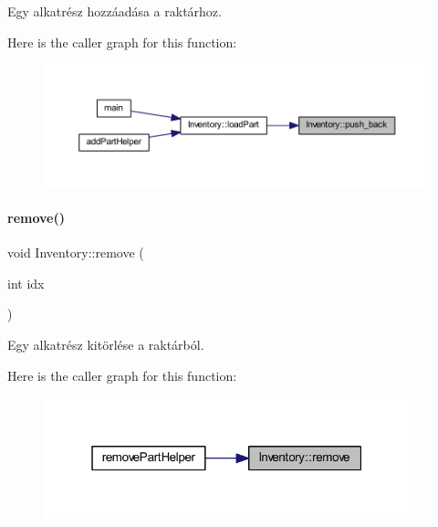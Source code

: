 Egy alkatrész hozzáadása a raktárhoz. 

Here is the caller graph for this function\+:
\nopagebreak
\begin{figure}[H]
\begin{center}
\leavevmode
\includegraphics[width=350pt]{class_inventory_a86dd14362d6cefb46d4e40667c44481c_icgraph}
\end{center}
\end{figure}
\mbox{\label{class_inventory_a1f602317e97625523444591ac5bf8bd7}} 
\paragraph{\texorpdfstring{remove()}{remove()}}
{\footnotesize\ttfamily void Inventory\+::remove (\begin{DoxyParamCaption}\item[{int}]{idx }\end{DoxyParamCaption})}



Egy alkatrész kitörlése a raktárból. 

Here is the caller graph for this function\+:
\nopagebreak
\begin{figure}[H]
\begin{center}
\leavevmode
\includegraphics[width=301pt]{class_inventory_a1f602317e97625523444591ac5bf8bd7_icgraph}
\end{center}
\end{figure}
\mbox{\label{class_inventory_a243a3e96705999b3cf556e9626a96525}} 
